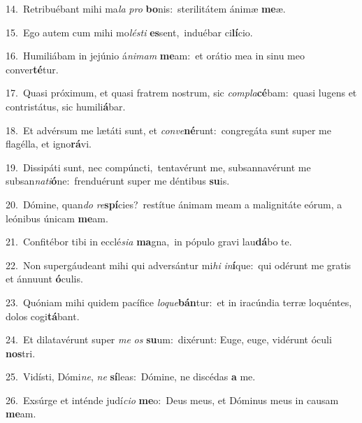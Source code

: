 {\numbfont\textcolor{\numbcolor}{14.}}~Retribuébant mihi ma\textit{la} \textit{pro} \textbf{bo}\-nis:~\star sterilitátem ánimæ \textbf{me}\-æ.\par
{\numbfont\textcolor{\numbcolor}{15.}}~Ego autem cum mihi mo\-\textit{lés}\-\textit{ti} \textbf{es}\-sent,~\star induébar ci\-\textbf{lí}\-cio.\par
{\numbfont\textcolor{\numbcolor}{16.}}~Humiliábam in jejúnio á\-\textit{ni}\-\textit{mam} \textbf{me}\-am:~\star et orátio mea in sinu meo conver\-\textbf{té}\-tur.\par
{\numbfont\textcolor{\numbcolor}{17.}}~Quasi próximum, et quasi fratrem nostrum, sic \textit{com}\-\textit{pla}\textbf{cé}bam:~\star quasi lugens et contristátus, sic humili\-\textbf{á}\-bar.\par
{\numbfont\textcolor{\numbcolor}{18.}}~Et advérsum me lætáti sunt, et \textit{con}\-\textit{ve}\textbf{né}runt:~\star congregáta sunt super me flagélla, et igno\-\textbf{rá}\-vi.\par
{\numbfont\textcolor{\numbcolor}{19.}}~Dissipáti sunt, nec compúncti,~\dagger tentavérunt me, subsannavérunt me subsan\-\textit{na}\-\textit{ti}\textbf{ó}ne:~\star frenduérunt super me déntibus \textbf{su}\-is.\par
{\numbfont\textcolor{\numbcolor}{20.}}~Dómine, quan\textit{do} \textit{re}\-\textbf{spí}cies?~\star restítue ánimam meam a malignitáte eórum, a leónibus únicam \textbf{me}\-am.\par
{\numbfont\textcolor{\numbcolor}{21.}}~Confitébor tibi in ecclé\-\textit{si}\-\textit{a} \textbf{ma}\-gna,~\star in pópulo gravi lau\-\textbf{dá}\-bo te.\par
{\numbfont\textcolor{\numbcolor}{22.}}~Non supergáudeant mihi qui adversántur mi\textit{hi} \textit{in}\-\textbf{í}que:~\star qui odérunt me gratis et ánnuunt \textbf{ó}\-culis.\par
{\numbfont\textcolor{\numbcolor}{23.}}~Quóniam mihi quidem pacífice \textit{lo}\-\textit{que}\textbf{bán}tur:~\star et in iracúndia terræ loquéntes, dolos cogi\-\textbf{tá}\-bant.\par
{\numbfont\textcolor{\numbcolor}{24.}}~Et dilatavérunt super \textit{me} \textit{os} \textbf{su}\-um:~\star dixérunt: Euge, euge, vidérunt óculi \textbf{nos}\-tri.\par
{\numbfont\textcolor{\numbcolor}{25.}}~Vidísti, Dómi\-\textit{ne}\-, \textit{ne} \textbf{sí}\-leas:~\star Dómine, ne discédas \textbf{a} me.\par
{\numbfont\textcolor{\numbcolor}{26.}}~Exsúrge et inténde judí\-\textit{ci}\-\textit{o} \textbf{me}\-o:~\star Deus meus, et Dóminus meus in causam \textbf{me}\-am.\par
